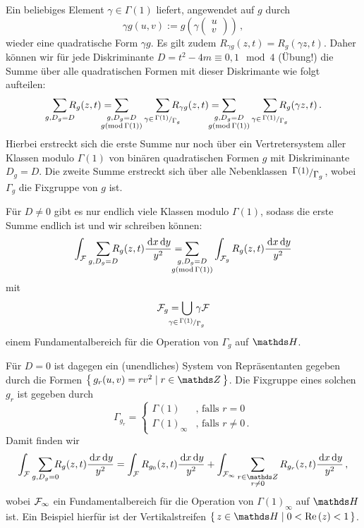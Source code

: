 \begin{bewe}
Ein beliebiges Element $\gamma \in \Gamma(1)$ liefert, angewendet auf $g$ durch
\[
	\gamma g (u, v) := g \left( \gamma \begin{pmatrix}u\\v\end{pmatrix} \right)
	\,,
\]
wieder eine quadratische Form $\gamma g$. Es gilt zudem $R_{\gamma g} (z, t) = R_g (\gamma z, t)$. Daher können wir für jede Diskriminante $D = t^2 - 4m \equiv 0,1 \mod 4$ (Übung!) die Summe über alle quadratischen Formen mit dieser Diskrimante wie folgt aufteilen:
\[
	\smashoperator[r]{\sum_{g, D_g = D}} R_g (z, t) = \smashoperator[l]{\sum_{\substack{g, D_g = D \\ g (\operatorname{mod} \Gamma(1))}}} \smashoperator[r]{\sum_{\gamma \in \modulo {\Gamma(1)} {\Gamma_g}}} R_{\gamma g} (z,t) = \smashoperator[l]{\sum_{\substack{g, D_g = D \\ g (\operatorname{mod} \Gamma(1))}}} \smashoperator[r]{\sum_{\gamma \in \modulo {\Gamma(1)} {\Gamma_g}}} R_g (\gamma z,t)
	\,.
\]
Hierbei erstreckt sich die erste Summe nur noch über ein Vertretersystem aller Klassen modulo $\Gamma(1)$ von binären quadratischen Formen $g$ mit Diskriminante $D_g = D$. Die zweite Summe erstreckt sich über alle Nebenklassen $\modulo {\Gamma(1)}{\Gamma_g}$, wobei $\Gamma_g$ die Fixgruppe von $g$ ist. 

Für $D \neq 0$ gibt es nur endlich viele Klassen modulo $\Gamma(1)$, sodass die erste Summe endlich ist und wir schreiben können:
\begin{equation}\label{eq:intFsumGforDneq0}
	\int_\F \smashoperator[r]{\sum_{g, D_g = D}} R_g(z,t) \frac{\opd x \opd y}{y^2} = \smashoperator[l]{\sum_{\substack{g, D_g = D \\ g (\operatorname{mod} \Gamma(1))}}} \int_{\F_g} R_g (z,t) \frac{\opd x \opd y}{y^2}
\end{equation}
mit 
\[
	\F_g = \smashoperator{\bigcup_{\gamma \in \modulo {\Gamma(1)}{\Gamma_g}}} \, \gamma \F
\]
einem Fundamentalbereich für die Operation von $\Gamma_g$ auf $\HH$.

Für $D = 0$ ist dagegen ein (unendliches) System von Repräsentanten gegeben durch die Formen $\Set {g_r(u,v) = rv^2 \mid r \in \ZZ }$. Die Fixgruppe eines solchen $g_r$ ist gegeben durch
\[
	\Gamma_{g_r} = \begin{cases} \Gamma(1) &\text{, falls } r = 0\\ \Gamma(1)_\infty &\text{, falls } r \neq 0 \,. \end{cases}
\]
Damit finden wir
\begin{equation}\label{eq:intFsumGforD=0}
	\int_\F \smashoperator[r]{\sum_{g, D_g = 0}} R_g(z,t) \frac{\opd x \opd y}{y^2} = \int_\F R_{g_0} (z,t) \frac{\opd x \opd y}{y^2} + \int_{\F_\infty} \sum_{\substack{r \in \ZZ \\ r \neq 0}} R_{g_r}(z,t) \frac{\opd x \opd y}{y^2}
	\,,
\end{equation}
wobei $\mathcal{F}_\infty$ ein Fundamentalbereich für die Operation von $\Gamma(1)_\infty$ auf $\HH$ ist. Ein Beispiel hierfür ist der Vertikalstreifen $\Set {z \in \HH \mid 0 < \Re (z) < 1}$.


\end{bewe}
